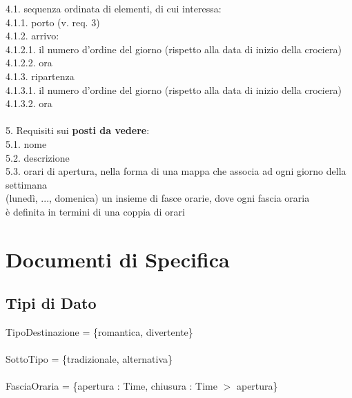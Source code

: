 \documentclass[12pt, letterpaper]{article}
\newcommand{\acc}{\\\hphantom{}\\}
\begin{document}
\hphantom{ident}4.1. sequenza ordinata di elementi, di cui interessa:\\
\hphantom{ident}\hphantom{ident}4.1.1. porto (v. req. 3)\\
\hphantom{ident}\hphantom{ident}4.1.2. arrivo:\\
\hphantom{ident}\hphantom{ident}\hphantom{ident}4.1.2.1. il numero d'ordine del giorno (rispetto alla data di inizio della crociera)\\
\hphantom{ident}\hphantom{ident}\hphantom{ident}4.1.2.2. ora\\
\hphantom{ident}\hphantom{ident}4.1.3. ripartenza	\\
\hphantom{ident}\hphantom{ident}\hphantom{ident}4.1.3.1. il numero d'ordine del giorno (rispetto alla data di inizio della crociera)\\
\hphantom{ident}\hphantom{ident}\hphantom{ident}4.1.3.2. ora
\acc
5. Requisiti sui \textbf{posti da vedere}:\\
\hphantom{ident}5.1. nome\\
\hphantom{ident}5.2. descrizione\\
\hphantom{ident}5.3. orari di apertura, nella forma di una mappa che associa ad ogni giorno della settimana\\
\hphantom{ident}\hphantom{ident}(lunedì, ..., domenica) un insieme di fasce orarie, dove ogni fascia oraria\\
\hphantom{ident}\hphantom{ident}è definita in termini di una coppia di orari

\newpage
\section{Documenti di Specifica}
\subsection{Tipi di Dato}
TipoDestinazione = \{romantica, divertente\}\acc 
SottoTipo = \{tradizionale, alternativa\}\acc 
FasciaOraria = \{apertura : Time, chiusura : Time $>$ apertura\}

\newpage
\end{document}
